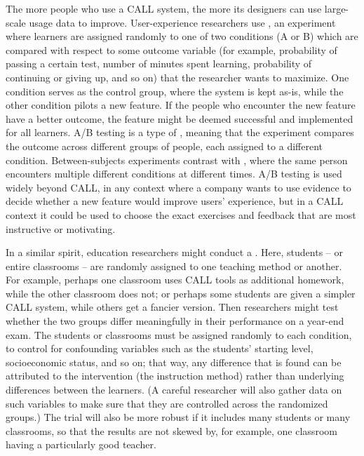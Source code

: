 The more people who use a CALL system, the more its designers can use large-scale usage data to improve.   User-experience researchers use , an experiment where learners are assigned randomly to one of
two conditions (A or B) which are compared with respect to some
outcome variable (for example, probability of passing a certain test,
number of minutes spent learning, probability of continuing or giving
up, and so on) that the researcher wants to maximize.  One condition
serves as the control group, where the system is kept as-is, while the
other condition pilots a new feature.  If the people who encounter the
new feature have a better outcome, the feature might be deemed
successful and implemented for all learners.  A/B testing is a type of
, meaning that the experiment
compares the outcome across different groups of people, each assigned
to a different condition.  Between-subjects experiments contrast with
, where the same person
encounters multiple different conditions at different times.  A/B
testing is used widely beyond CALL, in any context where a company
wants to use evidence to decide whether a new feature would improve
users' experience, but in a CALL context it could be used to choose
the exact exercises and feedback that are most instructive or
motivating.

In a similar spirit, education researchers might conduct a .  Here, students -- or entire classrooms -- are randomly assigned to one teaching method or another.  For example, perhaps one classroom uses CALL tools as additional homework, while the other classroom does not; or perhaps some students are given a simpler CALL system, while others get a fancier version.  Then  researchers might test whether the two groups differ meaningfully in their performance on a year-end exam.   The students or classrooms must be assigned randomly to each condition, to control for confounding variables such as the students' starting level, socioeconomic status, and so on; that way, any difference that is found can be attributed to the intervention (the instruction method) rather than underlying differences between the learners.  (A careful researcher will also gather data on such variables to make sure that they are controlled across the randomized groups.) The trial will also be more robust if it includes many students or many classrooms, so that the results are not skewed by, for example, one classroom having a particularly good teacher.

